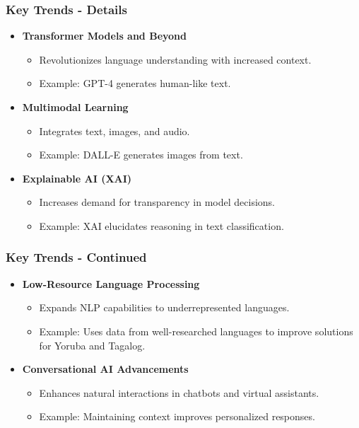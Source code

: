 \documentclass[aspectratio=169]{beamer}
\begin{document}
\begin{frame}[fragile]
    \frametitle{Key Trends - Details}
    \begin{itemize}
        \item \textbf{Transformer Models and Beyond}
        \begin{itemize}
            \item Revolutionizes language understanding with increased context.
            \item Example: GPT-4 generates human-like text.
        \end{itemize}

        \item \textbf{Multimodal Learning}
        \begin{itemize}
            \item Integrates text, images, and audio.
            \item Example: DALL-E generates images from text.
        \end{itemize}
        
        \item \textbf{Explainable AI (XAI)}
        \begin{itemize}
            \item Increases demand for transparency in model decisions.
            \item Example: XAI elucidates reasoning in text classification.
        \end{itemize}
    \end{itemize}
\end{frame}

\begin{frame}[fragile]
    \frametitle{Key Trends - Continued}
    \begin{itemize}
        \item \textbf{Low-Resource Language Processing}
        \begin{itemize}
            \item Expands NLP capabilities to underrepresented languages.
            \item Example: Uses data from well-researched languages to improve solutions for Yoruba and Tagalog.
        \end{itemize}

        \item \textbf{Conversational AI Advancements}
        \begin{itemize}
            \item Enhances natural interactions in chatbots and virtual assistants.
            \item Example: Maintaining context improves personalized responses.
        \end{itemize}
    \end{itemize}
\end{frame}
\end{document}
